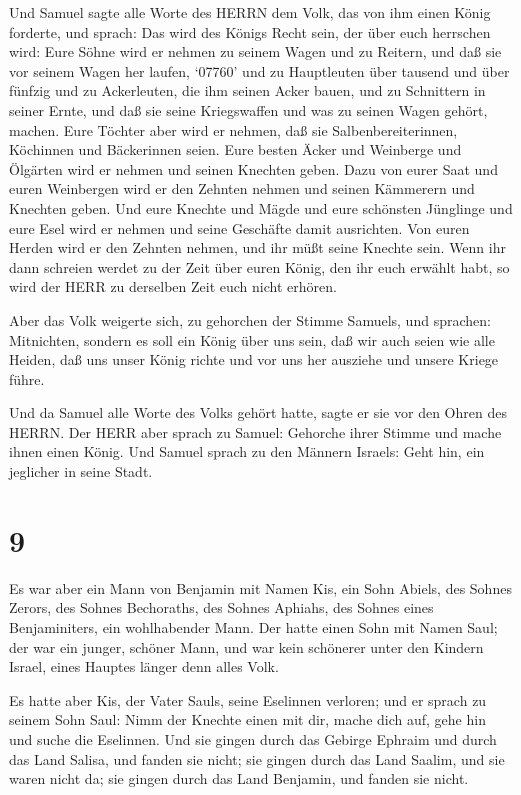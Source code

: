  Und Samuel sagte alle Worte des HERRN dem Volk, das von
ihm einen König forderte,  und sprach: Das wird des Königs
Recht sein, der über euch herrschen wird: Eure Söhne wird er nehmen zu
seinem Wagen und zu Reitern, und daß sie vor seinem Wagen her laufen,
 `07760' und zu Hauptleuten über tausend und über fünfzig
und zu Ackerleuten, die ihm seinen Acker bauen, und zu Schnittern in
seiner Ernte, und daß sie seine Kriegswaffen und was zu seinen Wagen
gehört, machen.  Eure Töchter aber wird er nehmen, daß sie
Salbenbereiterinnen, Köchinnen und Bäckerinnen seien.  Eure
besten Äcker und Weinberge und Ölgärten wird er nehmen und seinen
Knechten geben.  Dazu von eurer Saat und euren Weinbergen
wird er den Zehnten nehmen und seinen Kämmerern und Knechten geben.
 Und eure Knechte und Mägde und eure schönsten Jünglinge
und eure Esel wird er nehmen und seine Geschäfte damit ausrichten.
 Von euren Herden wird er den Zehnten nehmen, und ihr müßt
seine Knechte sein.  Wenn ihr dann schreien werdet zu der
Zeit über euren König, den ihr euch erwählt habt, so wird der HERR zu
derselben Zeit euch nicht erhören.

 Aber das Volk weigerte sich, zu gehorchen der Stimme
Samuels, und sprachen: Mitnichten, sondern es soll ein König über uns
sein,  daß wir auch seien wie alle Heiden, daß uns unser
König richte und vor uns her ausziehe und unsere Kriege führe.

 Und da Samuel alle Worte des Volks gehört hatte, sagte er
sie vor den Ohren des HERRN.  Der HERR aber sprach zu
Samuel: Gehorche ihrer Stimme und mache ihnen einen König. Und Samuel
sprach zu den Männern Israels: Geht hin, ein jeglicher in seine Stadt.

\hypertarget{section-8}{%
\section{9}\label{section-8}}

 Es war aber ein Mann von Benjamin mit Namen Kis, ein Sohn
Abiels, des Sohnes Zerors, des Sohnes Bechoraths, des Sohnes Aphiahs,
des Sohnes eines Benjaminiters, ein wohlhabender Mann.  Der
hatte einen Sohn mit Namen Saul; der war ein junger, schöner Mann, und
war kein schönerer unter den Kindern Israel, eines Hauptes länger denn
alles Volk.

 Es hatte aber Kis, der Vater Sauls, seine Eselinnen
verloren; und er sprach zu seinem Sohn Saul: Nimm der Knechte einen mit
dir, mache dich auf, gehe hin und suche die Eselinnen.  Und
sie gingen durch das Gebirge Ephraim und durch das Land Salisa, und
fanden sie nicht; sie gingen durch das Land Saalim, und sie waren nicht
da; sie gingen durch das Land Benjamin, und fanden sie nicht.

